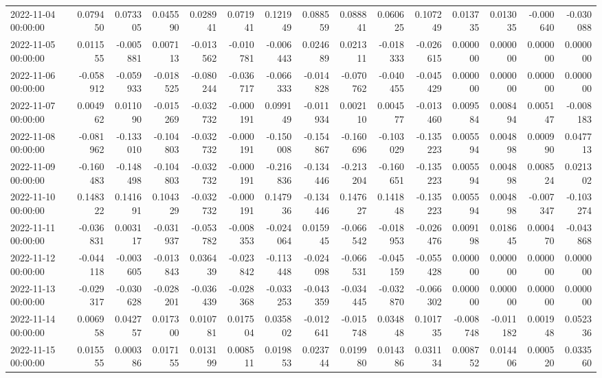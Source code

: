 \begin{tabular}{lrrrrrrrrrrrrrr}
2022-11-04 00:00:00 & 0.079450 & 0.073305 & 0.045590 & 0.028941 & 0.071941 & 0.121949 & 0.088559 & 0.088841 & 0.060625 & 0.107249 & 0.013735 & 0.013035 & -0.000640 & -0.030088 \\
2022-11-05 00:00:00 & 0.011555 & -0.005881 & 0.007113 & -0.013562 & -0.010781 & -0.006443 & 0.024689 & 0.021311 & -0.018333 & -0.026615 & 0.000000 & 0.000000 & 0.000000 & 0.000000 \\
2022-11-06 00:00:00 & -0.058912 & -0.059933 & -0.018525 & -0.080244 & -0.036717 & -0.066333 & -0.014828 & -0.070762 & -0.040455 & -0.045429 & 0.000000 & 0.000000 & 0.000000 & 0.000000 \\
2022-11-07 00:00:00 & 0.004962 & 0.011090 & -0.015269 & -0.032732 & -0.000191 & 0.099149 & -0.011934 & 0.002110 & 0.004577 & -0.013460 & 0.009584 & 0.008494 & 0.005147 & -0.008183 \\
2022-11-08 00:00:00 & -0.081962 & -0.133010 & -0.104803 & -0.032732 & -0.000191 & -0.150008 & -0.154867 & -0.160696 & -0.103029 & -0.135223 & 0.005594 & 0.004898 & 0.000990 & 0.047713 \\
2022-11-09 00:00:00 & -0.160483 & -0.148498 & -0.104803 & -0.032732 & -0.000191 & -0.216836 & -0.134446 & -0.213204 & -0.160651 & -0.135223 & 0.005594 & 0.004898 & 0.008524 & 0.021302 \\
2022-11-10 00:00:00 & 0.148322 & 0.141691 & 0.104329 & -0.032732 & -0.000191 & 0.147936 & -0.134446 & 0.147627 & 0.141848 & -0.135223 & 0.005594 & 0.004898 & -0.007347 & -0.103274 \\
2022-11-11 00:00:00 & -0.036831 & 0.003117 & -0.031937 & -0.053782 & -0.008353 & -0.024064 & 0.015945 & -0.066542 & -0.018953 & -0.026476 & 0.009198 & 0.018645 & 0.000470 & -0.043868 \\
2022-11-12 00:00:00 & -0.044118 & -0.003605 & -0.013843 & 0.036439 & -0.023842 & -0.113448 & -0.024098 & -0.066531 & -0.045159 & -0.055428 & 0.000000 & 0.000000 & 0.000000 & 0.000000 \\
2022-11-13 00:00:00 & -0.029317 & -0.030628 & -0.028201 & -0.036439 & -0.028368 & -0.033253 & -0.043359 & -0.034445 & -0.032870 & -0.066302 & 0.000000 & 0.000000 & 0.000000 & 0.000000 \\
2022-11-14 00:00:00 & 0.006958 & 0.042757 & 0.017300 & 0.010781 & 0.017504 & 0.035802 & -0.012641 & -0.015748 & 0.034848 & 0.101735 & -0.008748 & -0.011182 & 0.001948 & 0.052336 \\
2022-11-15 00:00:00 & 0.015555 & 0.000386 & 0.017155 & 0.013199 & 0.008511 & 0.019853 & 0.023744 & 0.019980 & 0.014386 & 0.031134 & 0.008752 & 0.014406 & 0.000520 & 0.033560 \\

\end{tabular}
